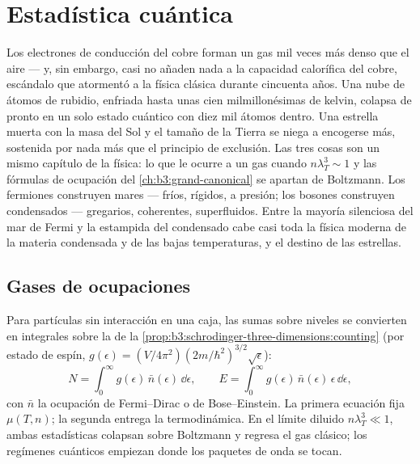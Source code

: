 \chapter{Estadística cuántica}\label{ch:b3:quantum-statistics}

Los electrones de conducción del cobre forman un gas mil veces más denso que
el aire --- y, sin embargo, casi no añaden nada a la capacidad calorífica del
cobre, escándalo que atormentó a la física clásica durante cincuenta años. Una
nube de átomos de rubidio, enfriada hasta unas cien milmillonésimas de kelvin,
colapsa de pronto en un solo estado cuántico con diez mil átomos
dentro. Una estrella muerta con la masa del Sol y el tamaño de la Tierra
se niega a encogerse más, sostenida por nada más que el principio de
exclusión. Las tres cosas son un mismo capítulo de la física: lo que le ocurre
a un gas cuando $n\lambda_T^3 \sim 1$ y las fórmulas de ocupación del
\cref{ch:b3:grand-canonical} se apartan de Boltzmann. Los fermiones construyen
mares --- fríos, rígidos, a presión; los bosones construyen condensados ---
gregarios, coherentes, superfluidos. Entre la mayoría silenciosa del mar de
Fermi y la estampida del condensado cabe casi toda la física moderna de la
materia condensada y de las bajas temperaturas, y el destino de las
estrellas.

\section{Gases de ocupaciones}

\begin{proposition}\label{prop:b3:quantum-statistics:machinery}
Para partículas sin interacción en una caja, las sumas sobre niveles se
convierten en integrales sobre la  de la
\cref{prop:b3:schrodinger-three-dimensions:counting} (por estado
de espín, $g(\epsilon) = (V/4\pi^2)(2m/\hbar^2)^{3/2}\sqrt\epsilon$):
\[
N = \int_0^\infty g(\epsilon)\,\bar n(\epsilon)\,\dd\epsilon ,
\qquad
E = \int_0^\infty g(\epsilon)\,\bar n(\epsilon)\,\epsilon\,
\dd\epsilon ,
\]
con $\bar n$ la ocupación de Fermi--Dirac o de Bose--Einstein. La
primera ecuación fija $\mu(T, n)$; la segunda entrega la
termodinámica. En el límite diluido $n\lambda_T^3 \ll 1$, ambas
estadísticas colapsan sobre Boltzmann y regresa el gas clásico;
los regímenes cuánticos empiezan donde los paquetes de onda se tocan.
\end{proposition}
\admitted

